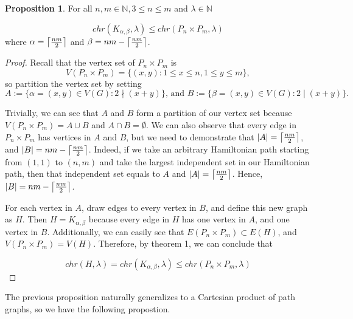\documentclass[11pt]{article}
\DeclarePairedDelimiter{\ceil}{\lceil}{\rceil}
\theoremstyle{definition}
\newcommand{\N}{{\mathbb{N}}}
\newtheorem{prop}{Proposition}
\begin{document}
\begin{prop}
For all $n,m \in \N, 3 \leq n \leq m$ and $\lambda \in \N$

\begin{equation}
chr(K_{\alpha, \beta}, \lambda) \leq chr(P_n \times P_m, \lambda)
\end{equation} where $\alpha = \ceil*{\frac{nm}{2}}$ and $\beta = nm - \ceil*{\frac{nm}{2}}$.
\end{prop}

\begin{proof}
Recall that the vertex set of $P_{n} \times P_{m}$ is 
\begin{equation}
V(P_{n} \times P_{m}) = \{(x,y): 1 \leq x \leq n, 1 \leq y \leq m \}, \nonumber
\end{equation} so partition the vertex set by setting 
\begin{equation}
A := \{ \alpha = (x, y) \in V(G): 2 \nmid (x + y)\} \text{, and }
B := \{\beta = (x, y) \in V(G): 2 \mid (x + y)\}. \nonumber
\end{equation}

Trivially, we can see that $A$ and $B$ form a partition of our vertex set because $V(P_n \times P_m) = A \cup B$ and $A \cap B = \emptyset$. We can also observe that every edge in $P_n \times P_m$ has vertices in $A$ and $B$, but we need to demonstrate that $|A| = \ceil*{\frac{nm}{2}}$, and $|B| = nm - \ceil*{\frac{nm}{2}}$. Indeed, if we take an arbitrary Hamiltonian path starting from $(1,1)$ to $(n,m)$ and take the largest independent set in our Hamiltonian path, then that independent set equals to $A$ and $|A| = \ceil*{\frac{nm}{2}}$. Hence, $|B| = nm - \ceil*{\frac{nm}{2}}$.

For each vertex in $A$, draw edges to every vertex in $B$, and define this new graph as $H$. Then $H = K_{\alpha, \beta}$ because every edge in $H$ has one vertex in $A$, and one vertex in $B$. Additionally, we can easily see that $E(P_{n} \times P_{m}) \subset E(H)$, and $V(P_{n} \times P_{m}) = V(H)$. Therefore, by theorem 1, we can conclude that

\begin{equation}
chr(H, \lambda) = chr(K_{\alpha, \beta},\lambda) \leq chr(P_{n} \times P_{m}, \lambda) \nonumber
\end{equation}

\end{proof}

The previous proposition naturally generalizes to a Cartesian product of path graphs, so we have the following propostion.
\end{document}
